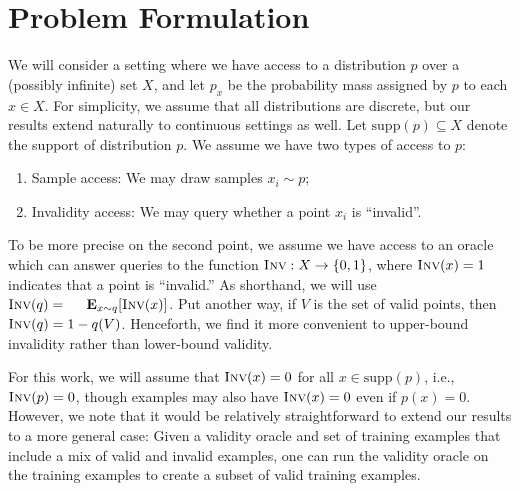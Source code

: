 \section{Problem Formulation}
\label{sec:problem}
We will consider a setting where we have access to a distribution $p$ over a (possibly infinite) set $X$, and let $p_x$ be the probability mass assigned by $p$ to each $x \in X$.
For simplicity, we assume that all distributions are discrete, but our results extend naturally to continuous settings as well.
Let $\text{supp}(p) \subseteq X$ denote the support of distribution $p$.
We assume we have two types of access to $p$:
\begin{enumerate}
\item Sample access: We may draw samples $x_i \sim p$;
\item Invalidity access: We may query whether a point $x_i$ is ``invalid''.
\end{enumerate}
To be more precise on the second point, we assume we have access to an oracle which can answer queries to the function $\textsc{Inv}: X \rightarrow \{0, 1\}$, where $\textsc{Inv}(x) = 1$ indicates that a point is ``invalid.'' As shorthand, we will use $\Inv(q) = \Exp_{x \sim q}[\Inv(x)]$. Put another way, if $V$ is the set of valid points, then $\textsc{Inv}(q)=1-q(V)$. Henceforth, we find it more convenient to upper-bound invalidity rather than lower-bound validity. %

For this work, we will assume that $\textsc{Inv}(x)=0$ for all $x \in \text{supp}(p)$, i.e., $\textsc{Inv}(p)=0$, though examples may also have $\textsc{Inv}(x)=0$ even if $p(x)=0$. However, we note that it would be relatively straightforward to extend our results to a more general case: %
Given a validity oracle and set of training examples that include a mix of valid and invalid examples, one can run the validity oracle on the training examples to create a subset of valid training examples. %


